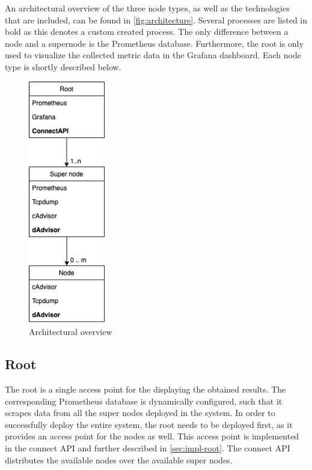 \noindent
An architectural overview of the three node types, as well as the technologies that are included, can be found in \autoref{fig:architecture}. Several processes are listed in bold as this denotes a custom created process. The only difference between a node and a supernode is the Prometheus database. Furthermore, the root is only used to visualize the collected metric data in the Grafana dashboard. Each node type is shortly described below.

\begin{figure}
    \centering
    \includegraphics[width=0.3\textwidth]{gfx/architecture.png}
    \caption{Architectural overview}
    \label{fig:architecture}
\end{figure}

\subsection{Root} \label{sec:root}
The root is a single access point for the displaying the obtained results. The corresponding Prometheus database is dynamically configured, such that it scrapes data from all the super nodes deployed in the system. 
In order to successfully deploy the entire system, the root needs to be deployed first, as it provides an access point for the nodes as well. This access point is implemented in the connect API and further described in \autoref{sec:impl-root}. The connect API distributes the available nodes over the available super nodes.

